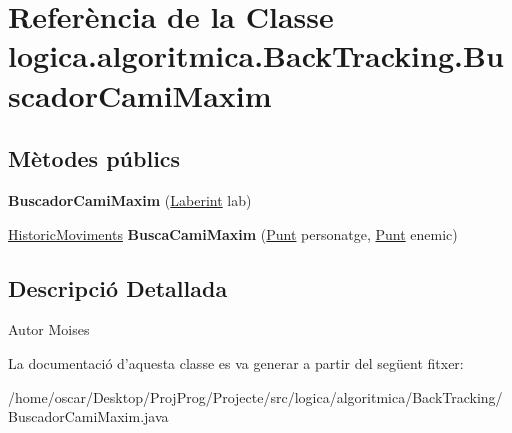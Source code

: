 \hypertarget{classlogica_1_1algoritmica_1_1_back_tracking_1_1_buscador_cami_maxim}{\section{Referència de la Classe logica.\+algoritmica.\+Back\+Tracking.\+Buscador\+Cami\+Maxim}
\label{classlogica_1_1algoritmica_1_1_back_tracking_1_1_buscador_cami_maxim}
}
\subsection*{Mètodes públics}
\begin{DoxyCompactItemize}
\item 
\hypertarget{classlogica_1_1algoritmica_1_1_back_tracking_1_1_buscador_cami_maxim_a67aadbdebeeb60a4b5aab24c9a2e42e9}{{\bfseries Buscador\+Cami\+Maxim} (\hyperlink{classlogica_1_1laberints_1_1_laberint}{Laberint} lab)}\label{classlogica_1_1algoritmica_1_1_back_tracking_1_1_buscador_cami_maxim_a67aadbdebeeb60a4b5aab24c9a2e42e9}

\item 
\hypertarget{classlogica_1_1algoritmica_1_1_back_tracking_1_1_buscador_cami_maxim_a42d7b99f36cc48910a8a10d4daaf4bcb}{\hyperlink{classlogica_1_1historic__moviments_1_1_historic_moviments}{Historic\+Moviments} {\bfseries Busca\+Cami\+Maxim} (\hyperlink{classlogica_1_1_punt}{Punt} personatge, \hyperlink{classlogica_1_1_punt}{Punt} enemic)}\label{classlogica_1_1algoritmica_1_1_back_tracking_1_1_buscador_cami_maxim_a42d7b99f36cc48910a8a10d4daaf4bcb}

\end{DoxyCompactItemize}


\subsection{Descripció Detallada}
\begin{DoxyAuthor}{Autor}
Moises 
\end{DoxyAuthor}


La documentació d'aquesta classe es va generar a partir del següent fitxer\+:\begin{DoxyCompactItemize}
\item 
/home/oscar/\+Desktop/\+Proj\+Prog/\+Projecte/src/logica/algoritmica/\+Back\+Tracking/Buscador\+Cami\+Maxim.\+java\end{DoxyCompactItemize}
